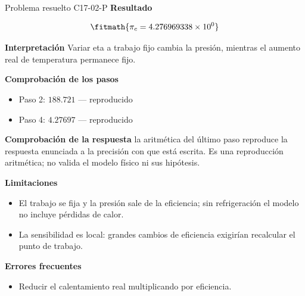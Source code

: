\documentclass[10pt,openany]{book}
\begin{document}
\begin{studiumworked}{Problema resuelto C17-02-P}
\noindent\textbf{Resultado}

\[
\fitmath{\pi_c=4.276969338\times10^{0}}
\]

\noindent\textbf{Interpretación}
Variar eta a trabajo fijo cambia la presión, mientras el aumento real de temperatura permanece fijo.

\noindent\textbf{Comprobación de los pasos}
\begin{itemize}
\item Paso 2: $188.721$ — reproducido
\item Paso 4: $4.27697$ — reproducido
\end{itemize}

\noindent\textbf{Comprobación de la respuesta} la aritmética del último paso reproduce la respuesta enunciada a la precisión con que está escrita. Es una reproducción aritmética; no valida el modelo físico ni sus hipótesis.

\noindent\textbf{Limitaciones}
\begin{itemize}
\item El trabajo se fija y la presión sale de la eficiencia; sin refrigeración el modelo no incluye pérdidas de calor.
\item La sensibilidad es local: grandes cambios de eficiencia exigirían recalcular el punto de trabajo.
\end{itemize}

\noindent\textbf{Errores frecuentes}
\begin{itemize}
\item Reducir el calentamiento real multiplicando por eficiencia.
\end{itemize}
\end{studiumworked}
\end{document}
